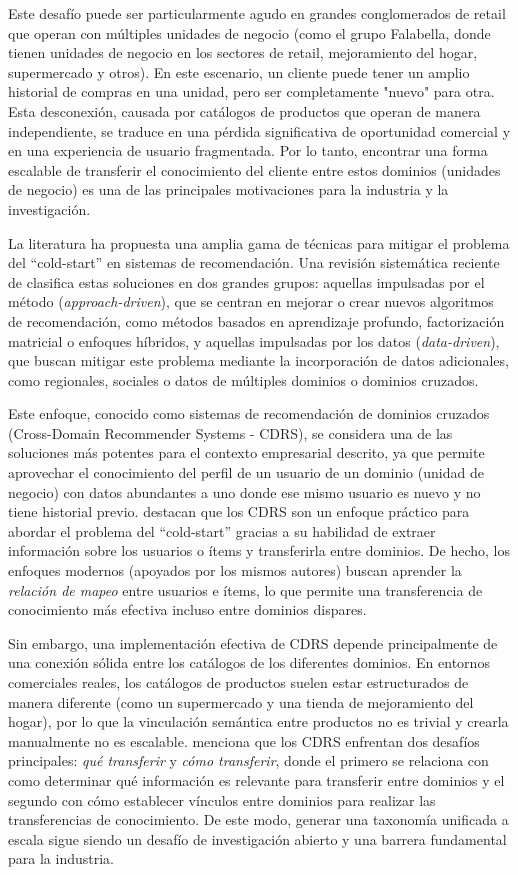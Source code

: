 Este desafío puede ser particularmente agudo en grandes conglomerados de retail que operan con múltiples unidades de negocio (como el grupo Falabella, donde tienen unidades de negocio en los sectores de retail, mejoramiento del hogar, supermercado y otros). En este escenario, un cliente puede tener un amplio historial de compras en una unidad, pero ser completamente "nuevo" para otra. Esta desconexión, causada por catálogos de productos que operan de manera independiente, se traduce en una pérdida significativa de oportunidad comercial y en una experiencia de usuario fragmentada. Por lo tanto, encontrar una forma escalable de transferir el conocimiento del cliente entre estos dominios (unidades de negocio) es una de las principales motivaciones para la industria y la investigación.

La literatura ha propuesta una amplia gama de técnicas para mitigar el problema del \enquote{cold-start} en sistemas de recomendación. Una revisión sistemática reciente de \cite{10339320} clasifica estas soluciones en dos grandes grupos: aquellas impulsadas por el método (\textit{approach-driven}), que se centran en mejorar o crear nuevos algoritmos de recomendación, como métodos basados en aprendizaje profundo, factorización matricial o enfoques híbridos, y aquellas impulsadas por los datos (\textit{data-driven}), que buscan mitigar este problema mediante la incorporación de datos adicionales, como regionales, sociales o datos de múltiples dominios o dominios cruzados.

Este enfoque, conocido como sistemas de recomendación de dominios cruzados (Cross-Domain Recommender Systems - CDRS), se considera una de las soluciones más potentes para el contexto empresarial descrito, ya que permite aprovechar el conocimiento del perfil de un usuario de un dominio (unidad de negocio) con datos abundantes a uno donde ese mismo usuario es nuevo y no tiene historial previo. \cite{9042271} destacan que los CDRS son un enfoque práctico para abordar el problema del \enquote{cold-start} gracias a su habilidad de extraer información sobre los usuarios o ítems y transferirla entre dominios. De hecho, los enfoques modernos (apoyados por los mismos autores) buscan aprender la \textit{relación de mapeo} entre usuarios e ítems, lo que permite una transferencia de conocimiento más efectiva incluso entre dominios dispares.

Sin embargo, una implementación efectiva de CDRS depende principalmente de una conexión sólida entre los catálogos de los diferentes dominios. En entornos comerciales reales, los catálogos de productos suelen estar estructurados de manera diferente (como un supermercado y una tienda de mejoramiento del hogar), por lo que la vinculación semántica entre productos no es trivial y crearla manualmente no es escalable. \cite{10.1145/3548455} menciona que los CDRS enfrentan dos desafíos principales: \textit{qué transferir} y \textit{cómo transferir}, donde el primero se relaciona con como determinar qué información es relevante para transferir entre dominios y el segundo con cómo establecer vínculos entre dominios para realizar las transferencias de conocimiento. De este modo, generar una taxonomía unificada a escala sigue siendo un desafío de investigación abierto y una barrera fundamental para la industria.

